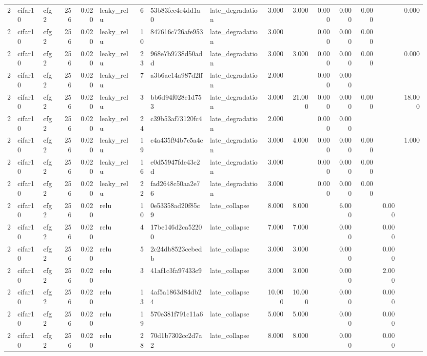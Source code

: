 \begin{table}[htbp]
{\begin{tabular}{@{}rllrrlrllrrrrrrr@{}}
2 & cifar10 & cfg2 & 256 & 0.020 & leaky\_relu & 6 & 53b83fec4e4dd1a0 & late\_degradation & 3.000 & 3.000 & 0.000 & 0.000 & 0.000 &  & 0.000 \\
2 & cifar10 & cfg2 & 256 & 0.020 & leaky\_relu & 10 & 847616c726afe953 & late\_degradation & 3.000 &  & 0.000 & 0.000 & 0.000 &  &  \\
2 & cifar10 & cfg2 & 256 & 0.020 & leaky\_relu & 23 & 968e7b9738d50add & late\_degradation & 3.000 & 3.000 & 0.000 & 0.000 & 0.000 &  & 0.000 \\
2 & cifar10 & cfg2 & 256 & 0.020 & leaky\_relu & 7 & a3b6ae14a987d2ff & late\_degradation & 2.000 &  & 0.000 & 0.000 &  &  &  \\
2 & cifar10 & cfg2 & 256 & 0.020 & leaky\_relu & 3 & bb6d94f028e1d753 & late\_degradation & 3.000 & 21.000 & 0.000 & 0.000 & 0.000 &  & 18.000 \\
2 & cifar10 & cfg2 & 256 & 0.020 & leaky\_relu & 24 & c39b53af73120fc4 & late\_degradation & 2.000 &  & 0.000 & 0.000 &  &  &  \\
2 & cifar10 & cfg2 & 256 & 0.020 & leaky\_relu & 19 & c4a435f94b7c5a4c & late\_degradation & 3.000 & 4.000 & 0.000 & 0.000 & 0.000 &  & 1.000 \\
2 & cifar10 & cfg2 & 256 & 0.020 & leaky\_relu & 16 & e0d55947fde43c2d & late\_degradation & 3.000 &  & 0.000 & 0.000 & 0.000 &  &  \\
2 & cifar10 & cfg2 & 256 & 0.020 & leaky\_relu & 22 & fad2648c50aa2e76 & late\_degradation & 3.000 &  & 0.000 & 0.000 & 0.000 &  &  \\
2 & cifar10 & cfg2 & 256 & 0.020 & relu & 10 & 0e53358ad20f85c9 & late\_collapse & 8.000 & 8.000 &  & 6.000 &  & 0.000 &  \\
2 & cifar10 & cfg2 & 256 & 0.020 & relu & 4 & 17be146d2ca52200 & late\_collapse & 7.000 & 7.000 &  & 0.000 &  & 0.000 &  \\
2 & cifar10 & cfg2 & 256 & 0.020 & relu & 5 & 2c24db8523cebedb & late\_collapse & 3.000 & 3.000 &  & 0.000 &  & 0.000 &  \\
2 & cifar10 & cfg2 & 256 & 0.020 & relu & 3 & 41af1c3fa97433c9 & late\_collapse & 3.000 & 3.000 &  & 0.000 &  & 2.000 &  \\
2 & cifar10 & cfg2 & 256 & 0.020 & relu & 13 & 4af5a1863d84db24 & late\_collapse & 10.000 & 10.000 &  & 0.000 &  & 0.000 &  \\
2 & cifar10 & cfg2 & 256 & 0.020 & relu & 19 & 570e381f791c11a6 & late\_collapse & 5.000 & 5.000 &  & 0.000 &  & 0.000 &  \\
2 & cifar10 & cfg2 & 256 & 0.020 & relu & 28 & 70d1b7302cc2d7a2 & late\_collapse & 8.000 & 8.000 &  & 0.000 &  & 0.000 &  \\

\end{tabular}}
\end{table}
